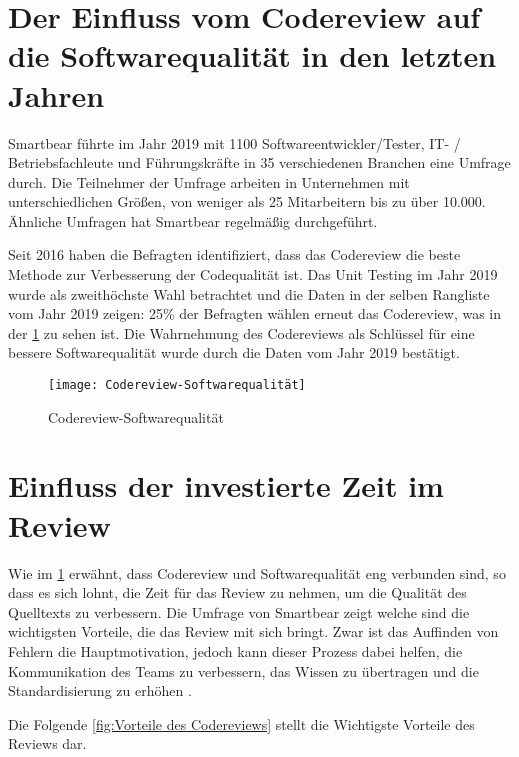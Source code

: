 \section{Der Einfluss vom Codereview auf die Softwarequalität in den letzten Jahren}
\label{sec:Einfluss des Reviews}
Smartbear \cite{smartbear} führte im Jahr 2019 mit 1100 Softwareentwickler/Tester, IT- / Betriebsfachleute und Führungskräfte in 35 verschiedenen Branchen eine Umfrage durch. Die Teilnehmer der Umfrage arbeiten in Unternehmen mit unterschiedlichen Größen, von weniger als 25 Mitarbeitern bis zu über 10.000. Ähnliche Umfragen hat Smartbear regelmäßig durchgeführt.

Seit 2016 haben die Befragten identifiziert, dass das Codereview die beste Methode zur Verbesserung der Codequalität ist. Das Unit Testing im Jahr 2019 wurde als zweithöchste Wahl betrachtet und die Daten in der selben Rangliste vom Jahr 2019 zeigen: 25\% der Befragten wählen erneut das Codereview, was in der \cref{fig:Codereview-Softwarequalität} zu sehen ist. Die Wahrnehmung des Codereviews als Schlüssel für eine bessere Softwarequalität wurde durch die Daten vom Jahr 2019 bestätigt.

\begin{figure}[H]
	\centering
	\texttt{[image: Codereview-Softwarequalität]}
	\caption[Einfluss der Codereview auf die Softwarequalität]{Codereview-Softwarequalität\\ \cite{smartbear}}
	\label{fig:Codereview-Softwarequalität}
\end{figure}

\section{Einfluss der investierte Zeit im Review}
\label{sec:reviewZeit}

Wie im \cref{sec:Einfluss des Reviews} erwähnt, dass Codereview und Softwarequalität eng verbunden sind, so dass es sich lohnt, die Zeit für das Review zu nehmen, um die Qualität des Quelltexts zu verbessern. Die Umfrage von Smartbear zeigt welche sind die wichtigsten Vorteile, die das Review mit sich bringt. Zwar ist das Auffinden von Fehlern die Hauptmotivation, jedoch kann dieser Prozess dabei helfen, die Kommunikation des Teams zu verbessern, das Wissen zu übertragen und die Standardisierung zu erhöhen \cite{smartbear}. 

Die Folgende \cref{fig:Vorteile des Codereviews} stellt die Wichtigste Vorteile des Reviews dar.

